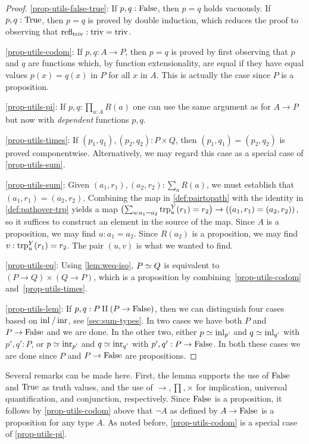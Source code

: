 \begin{proof}
\ref{prop-utils-false-true}:
If $p,q : \mathrm{False}$, then $p=q$ holds vacuously.
If $p,q : \mathrm{True}$, then $p=q$ is proved by double induction,
which reduces the proof to observing that $\mathrm{refl}_{\mathrm{triv}}: \mathrm{triv}=\mathrm{triv}$.

\ref{prop-utils-codom}:
If $p,q : A\to P$, then $p=q$ is proved by first observing that $p$ and $q$
are functions which, by function extensionality, are equal if they have
equal values $p(x) = q(x)$ in $P$ for all $x$ in $A$. This is
actually the case since $P$ is a proposition.

\ref{prop-utils-pi}:
If $p,q : \prod_{a:A} R(a)$ one can use the same argument as for $A\to P$
but now with \emph{dependent} functions $p,q$.

\ref{prop-utils-times}:
If $(p_1,q_1),(p_2,q_2) : P\times Q$, then $(p_1,q_1)=(p_2,q_2)$
is proved componentwise.  Alternatively, we may regard this case as a special case of \ref{prop-utils-sum}.

\ref{prop-utils-sum}:
Given $(a_1,r_1), (a_2,r_2) : \sum_a R(a)$, we must establish that $(a_1,r_1) = (a_2,r_2)$.  Combining the map in \cref{def:pairtopath} with the
identity in \cref{def:pathover-trp} yields a map $ \left( \sum_{u : a_1 = a_2} \trp[Y]{u}(r_1)=r_2 \right) \to \left( (a_1,r_1) = (a_2,r_2)
\right)$, so it suffices to construct an element in the source of the map.  Since $A$ is a proposition, we may find $u : a_1 = a_2$.  Since
$R(a_2)$ is a proposition, we may find $v : \trp[Y]{u}(r_1)=r_2$.  The pair $(u,v)$ is what we wanted to find.

\ref{prop-utils-eq}:
Using \cref{lem:weq-iso}, $P \simeq Q$ is equivalent to
$(P\to Q)\times(Q\to P)$, which is a proposition by 
combining~\ref{prop-utils-codom} and~\ref{prop-utils-times}.

\ref{prop-utils-lem}:
If $p,q : P\amalg (P\to\mathrm{False})$, then we can distinguish four cases
based on $\inl{}/\inr{}$, see \cref{sec:sum-types}. In two cases
we have both $P$ and $P\to\mathrm{False}$ and we are done. In the other two,
either $p\jdeq \inl{p'}$ and $q\jdeq \inl{q'}$ with $p',q':P$,
or $p\jdeq \inr{p'}$ and $q\jdeq \inr{q'}$ with $p',q':P\to\mathrm{False}$.
In both these cases we are done since $P$ and $P\to\mathrm{False}$ 
are propositions.
\end{proof}

Several remarks can be made here. First, the lemma supports the
use of $\mathrm{False}$ and $\mathrm{True}$ as truth values, and the use of
$\to,\prod,\times$ for implication, universal quantification,
and conjunction, respectively. Since $\mathrm{False}$ is a proposition,
it follows by \ref{prop-utils-codom} above that
$\neg A$ as defined by $A\to\mathrm{False}$ is a proposition for any type $A$.
As noted before, \ref{prop-utils-codom} is a
special case of \ref{prop-utils-pi}.

